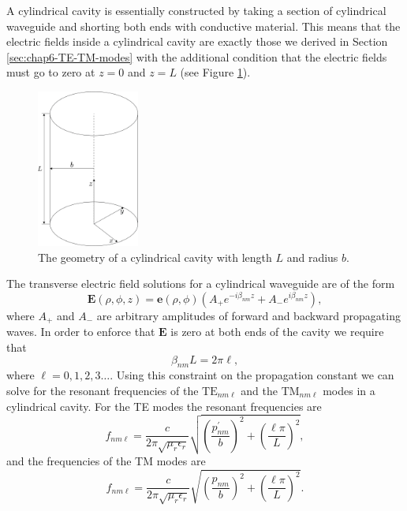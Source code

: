 A cylindrical cavity is essentially constructed by taking a section of cylindrical waveguide and shorting both ends with conductive material. This means that the electric fields inside a cylindrical cavity are exactly those we derived in Section \ref{sec:chap6-TE-TM-modes} with the additional condition that the electric fields must go to zero at $z=0$ and $z=L$ (see Figure \ref{fig:chap6-cyl-cav}).
\begin{figure}[htbp]
    \centering
    \includegraphics*[width=0.3\textwidth]{figs/Chapter-6/230606_cylindrical_cavity.png}
    \caption{\label{fig:chap6-cyl-cav} The geometry of a cylindrical cavity with length $L$ and radius $b$.}
\end{figure}

The transverse electric field solutions for a cylindrical waveguide are of the form
\begin{equation}
    \bm{E}(\rho,\phi,z)=\bm{e}(\rho,\phi)\left(A_+e^{-i\beta_{nm}z}+A_-e^{i\beta_{nm}z }\right),
\end{equation}
where $A_+$ and $A_-$ are arbitrary amplitudes of forward and backward propagating waves. In order to enforce that $\bm{E}$ is zero at both ends of the cavity we require that 
\begin{equation}
    \beta_{nm}L = 2\pi \ell,
\end{equation}
where $\ell=0,1,2,3\ldots$. Using this constraint on the propagation constant we can solve for the resonant frequencies of the $\mathrm{TE}_{nm\ell}$ and the $\mathrm{TM}_{nm\ell}$ modes in a cylindrical cavity. For the TE modes the resonant frequencies are
\begin{equation}
    f_{nm\ell}=\frac{c}{2\pi\sqrt{\mu_r\epsilon_r}}\sqrt{\left(\frac{p_{nm}^\prime}{b}\right)^2+\left(\frac{\ell\pi}{L}\right)^2},
\end{equation}
and the frequencies of the TM modes are 
\begin{equation}
    f_{nm\ell}=\frac{c}{2\pi\sqrt{\mu_r\epsilon_r}}\sqrt{\left(\frac{p_{nm}}{b}\right)^2+\left(\frac{\ell\pi}{L}\right)^2}.
\end{equation}

